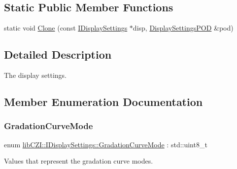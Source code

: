 \subsection*{Static Public Member Functions}
\begin{DoxyCompactItemize}
\item 
static void \hyperlink{classlib_c_z_i_1_1_i_display_settings_a0120cb7865379fc27912489dc20bbd01}{Clone} (const \hyperlink{classlib_c_z_i_1_1_i_display_settings}{I\+Display\+Settings} $\ast$disp, \hyperlink{structlib_c_z_i_1_1_display_settings_p_o_d}{Display\+Settings\+P\+OD} \&pod)
\end{DoxyCompactItemize}


\subsection{Detailed Description}
The display settings. 

\subsection{Member Enumeration Documentation}
\mbox{\label{classlib_c_z_i_1_1_i_display_settings_af114dfcc8a603ca1c2fc57bc35c97684}} 
\subsubsection{\texorpdfstring{Gradation\+Curve\+Mode}{GradationCurveMode}}
{\footnotesize\ttfamily enum \hyperlink{classlib_c_z_i_1_1_i_display_settings_af114dfcc8a603ca1c2fc57bc35c97684}{lib\+C\+Z\+I\+::\+I\+Display\+Settings\+::\+Gradation\+Curve\+Mode} \+: std\+::uint8\+\_\+t\hspace{0.3cm}{\ttfamily [strong]}}



Values that represent the gradation curve modes. 

